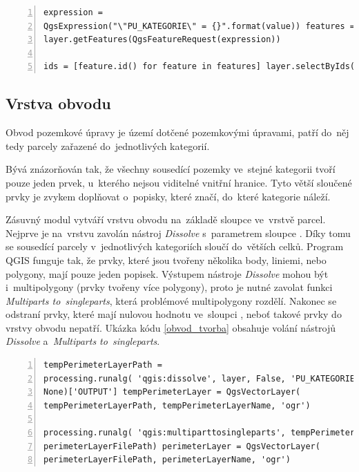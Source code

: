 {\scriptsize
\begin{lstlisting}[style=python, caption={Kategorie parcel~– výběr
prvků v~kategorii}, captionpos=b, label=vyber_v_kategorii,
backgroundcolor = \color{light-gray}, numbers=left] expression =
QgsExpression("\"PU_KATEGORIE\" = {}".format(value)) features =
layer.getFeatures(QgsFeatureRequest(expression))

ids = [feature.id() for feature in features] layer.selectByIds(ids)
\end{lstlisting}}

\subsection{Vrstva obvodu}
\label{vrstva_obvodu}

Obvod pozemkové úpravy je území dotčené pozemkovými úpravami, patří
do~něj tedy parcely zařazené do~jednotlivých kategorií.

Bývá znázorňován tak, že všechny sousedící pozemky ve~stejné kategorii
tvoří pouze jeden prvek, u~kterého nejsou viditelné vnitřní
hranice. Tyto větší sloučené prvky je zvykem doplňovat o~popisky,
které značí, do~které kategorie náleží.

Zásuvný modul vytváří vrstvu obvodu na~základě sloupce
\texttt{} ve~vrstvě parcel. Nejprve je
na~vrstvu \texttt{} zavolán nástroj \textit{Dissolve}
s~parametrem sloupce \texttt{}. Díky tomu se
sousedící parcely v~jednotlivých kategoriích sloučí do~větších
celků. Program QGIS funguje tak, že prvky, které jsou tvořeny několika
body, liniemi, nebo polygony, mají pouze jeden popisek. Výstupem
nástroje \textit{Dissolve} mohou být i~multipolygony (prvky tvořeny
více polygony), proto je nutné zavolat funkci \textit{Multiparts
to~singleparts}, která problémové multipolygony rozdělí. Nakonec se
odstraní prvky, které mají nulovou hodnotu ve~sloupci
\texttt{}, neboť takové prvky do vrstvy
obvodu nepatří. Ukázka kódu \ref{obvod_tvorba} obsahuje volání
nástrojů \textit{Dissolve} a~\textit{Multiparts to~singleparts}.

{\scriptsize
\begin{lstlisting}[style=python, caption={Vrstva obvodu~– tvorba},
captionpos=b, label=obvod_tvorba, backgroundcolor =
\color{light-gray}, numbers=left] tempPerimeterLayerPath =
processing.runalg( 'qgis:dissolve', layer, False, 'PU_KATEGORIE',
None)['OUTPUT'] tempPerimeterLayer = QgsVectorLayer(
tempPerimeterLayerPath, tempPerimeterLayerName, 'ogr')

processing.runalg( 'qgis:multiparttosingleparts', tempPerimeterLayer,
perimeterLayerFilePath) perimeterLayer = QgsVectorLayer(
perimeterLayerFilePath, perimeterLayerName, 'ogr')
\end{lstlisting}}

